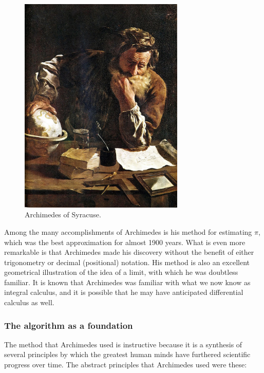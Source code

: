 \documentclass[
  a4paper,
]{article}
\begin{document}
\begin{figure}
\centering
\includegraphics[width=0.7\textwidth,height=\textheight]{images/Domenico-Fetti_Archimedes_1620.jpg}
\caption{Archimedes of Syracuse.}\label{fig:archimedes}
\end{figure}

Among the many accomplishments of Archimedes is his method for
estimating \(\pi\), which was the best approximation for almost 1900
years. What is even more remarkable is that Archimedes made his
discovery without the benefit of either trigonometry or decimal
(positional) notation. His method is also an excellent geometrical
illustration of the idea of a limit, with which he was doubtless
familiar. It is known that Archimedes was familiar with what we now know
as integral calculus, and it is possible that he may have anticipated
differential calculus as well.

\subsubsection{The algorithm as a
foundation}\label{the-algorithm-as-a-foundation}

The method that Archimedes used is instructive because it is a synthesis
of several principles by which the greatest human minds have furthered
scientific progress over time. The abstract principles that Archimedes
used were these:
\end{document}
